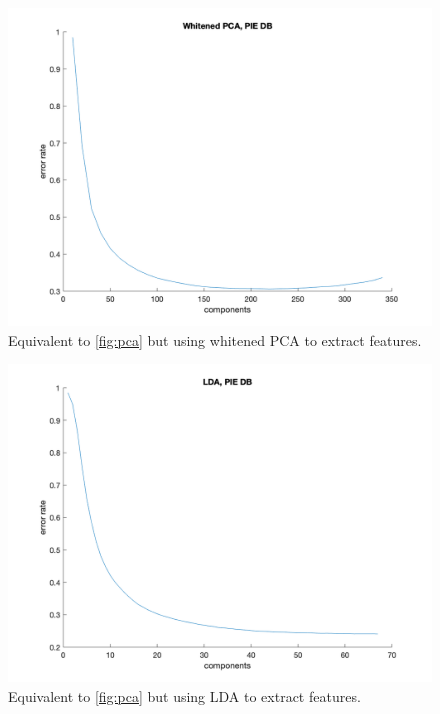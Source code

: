 \documentclass[12pt,twoside]{article}
\begin{document}
\begin{figure}[H]
    \centering
    \includegraphics[width = 0.8\hsize]{./figures/wpca.png}
    \caption[...]{Equivalent to \autoref{fig:pca} but using whitened PCA to extract features.}
    \label{fig:wpca}
\end{figure}

\begin{figure}[H]
    \centering
    \includegraphics[width = 0.8\hsize]{./figures/lda.png}
    \caption[...]{Equivalent to \autoref{fig:pca} but using LDA to extract features.}
    \label{fig:lda}
\end{figure}

\newpage
\section{}

\subsection{}
\end{document}
